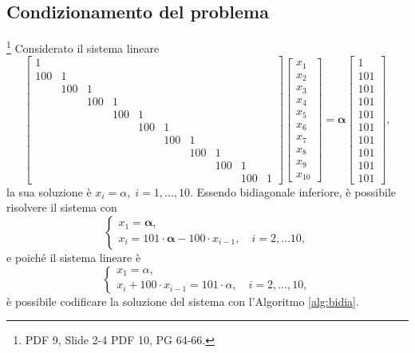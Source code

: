 \subsection{Condizionamento del problema}\footnote{PDF 9, Slide 2-4 PDF 10, PG 64-66.}
Considerato il sistema lineare
\begin{equation}\label{eq:sistLinBidiag}
    \begin{bmatrix}
        1\\
        100 & 1\\
        & 100 & 1\\
        & & 100 & 1\\
        & & & 100 & 1\\
        & & & & 100 & 1\\
        & & & & & 100 & 1\\
        & & & & & & 100 & 1\\
        & & & & & & & 100 & 1\\
        & & & & & & & & 100 & 1
    \end{bmatrix}\begin{bmatrix}
        x_1\\
        x_2\\
        x_3\\
        x_4\\
        x_5\\
        x_6\\
        x_7\\
        x_8\\
        x_9\\
        x_{10}
    \end{bmatrix} = 
    \boldsymbol\alpha\begin{bmatrix}
        1\\
        101\\
        101\\
        101\\
        101\\
        101\\
        101\\
        101\\
        101\\
        101
    \end{bmatrix},
\end{equation}
la sua soluzione è $x_i=\alpha,\; i = 1, \hdots, 10$. Essendo bidiagonale inferiore, è possibile risolvere il sistema con
\begin{equation*}
    \begin{cases}
        x_1 = \boldsymbol\alpha,\\
        x_i = 101\cdot\boldsymbol\alpha - 100\cdot x_{i-1},\quad i=2,\hdots10,
    \end{cases}
\end{equation*}
e poiché il sistema lineare è
\begin{equation*}
    \begin{cases}
        x_1=\alpha,\\
        x_i+100\cdot x_{i-1} = 101\cdot \alpha,\quad i=2,\hdots,10,
    \end{cases}
\end{equation*}
è possibile codificare la soluzione del sistema con l'Algoritmo \ref{alg:bidia}.

